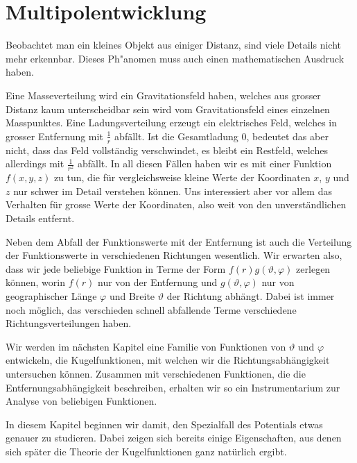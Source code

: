 %
%
%
\chapter{Multipolentwicklung
\label{skript:chapter:multipol}}
\rhead{}
Beobachtet man ein kleines Objekt aus einiger Distanz, sind viele
Details nicht mehr erkennbar.
Dieses Ph"anomen muss auch einen mathematischen Ausdruck haben.

Eine Masseverteilung wird ein Gravitationsfeld haben, welches aus
grosser Distanz kaum unterscheidbar sein wird vom Gravitationsfeld
eines einzelnen Masspunktes.
Eine Ladungsverteilung erzeugt ein elektrisches Feld, welches in
grosser Entfernung mit $\frac1r$ abfällt.
Ist die Gesamtladung $0$, bedeutet das aber nicht, dass das
Feld vollständig verschwindet, es bleibt ein Restfeld, welches
allerdings mit $\frac1{r^2}$ abfällt.
In all diesen Fällen haben wir es mit einer Funktion $f(x,y,z)$ zu tun,
die für vergleichsweise kleine Werte der Koordinaten $x$, $y$ und $z$
nur schwer im Detail verstehen können.
Uns interessiert aber vor allem das Verhalten für grosse Werte der
Koordinaten, also weit von den unverständlichen Details entfernt.

Neben dem Abfall der Funktionswerte mit der Entfernung ist auch
die Verteilung der Funktionswerte in verschiedenen Richtungen wesentlich.
Wir erwarten also, dass wir jede beliebige Funktion in Terme der Form
$
f(r) g(\vartheta,\varphi)
$
zerlegen können, worin $f(r)$ nur von der Entfernung und $g(\vartheta,\varphi)$
nur von geographischer Länge $\varphi$ und Breite $\vartheta$ der Richtung
abhängt.
Dabei ist immer noch möglich, das verschieden schnell abfallende
Terme verschiedene Richtungsverteilungen haben.

Wir werden im nächsten Kapitel eine Familie von Funktionen
von $\vartheta$ und $\varphi$ entwickeln, die Kugelfunktionen,
mit welchen wir die Richtungsabhängigkeit untersuchen können.
Zusammen mit verschiedenen Funktionen, die die Entfernungsabhängigkeit
beschreiben, erhalten wir so ein Instrumentarium zur Analyse von
beliebigen Funktionen.

In diesem Kapitel beginnen wir damit, den Spezialfall des Potentials
etwas genauer zu studieren.
Dabei zeigen sich bereits einige Eigenschaften, aus denen sich
später die Theorie der Kugelfunktionen ganz natürlich ergibt.








